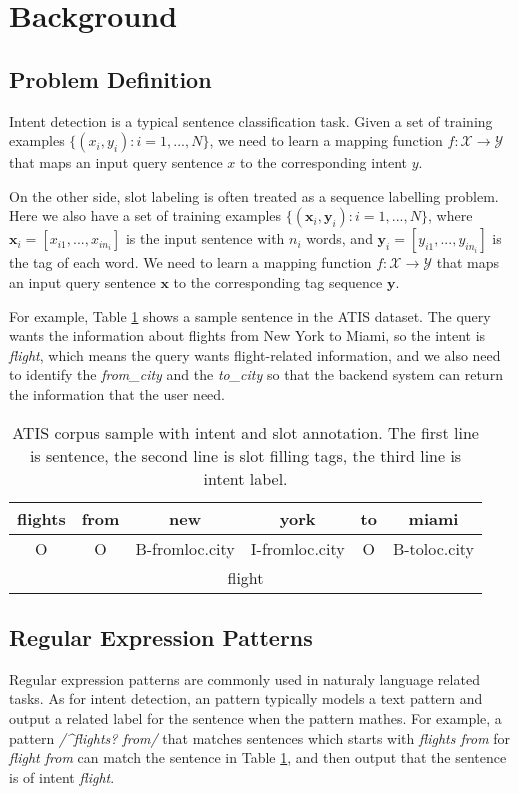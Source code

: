 \section{Background}
\subsection{Problem Definition}
Intent detection is a typical sentence classification task. Given a set of training examples $\{(x_i, y_i): i=1,...,N\}$, we need to learn a mapping function $f: \mathcal{X} \rightarrow \mathcal{Y}$ that maps an input query sentence $x$ to the corresponding intent $y$.

On the other side, slot labeling is often treated as a sequence labelling problem. Here we also have a set of training examples $\{(\textbf{x}_i, \textbf{y}_i): i=1,...,N\}$, where $\textbf{x}_i=[x_{i1}, ..., x_{in_i}]$ is the input sentence with $n_i$ words, and $\textbf{y}_i=[y_{i1}, ..., y_{in_i}]$ is the tag of each word. We need to learn a mapping function $f: \mathcal{X} \rightarrow \mathcal{Y}$ that maps an input query sentence $\textbf{x}$ to the corresponding tag sequence $\textbf{y}$.

For example, Table \ref{atis_sample} shows a sample sentence in the ATIS dataset. The query wants the information about flights from New York to Miami, so the intent is \emph{flight}, which means the query wants flight-related information, and we also need to identify the \emph{from\_city} and the \emph{to\_city} so that the backend system can return the information that the user need.

\begin{table}
\setlength{\tabcolsep}{0.23em}
\centering
\small{
\begin{tabular}{|c|c|c|c|c|c|}

\hline
flights &from &new &york &to &miami  \\
\hline
O &O &B-fromloc.city &I-fromloc.city &O &B-toloc.city  \\
\hline
\multicolumn{6}{|c|}{flight} \\
\hline
\end{tabular}
}
\caption{ATIS corpus sample with intent and slot annotation. The first line is sentence, the second line is slot filling tags, the third line is intent label.}
\label{atis_sample}
\end{table}

\subsection{Regular Expression Patterns}
Regular expression patterns are commonly used in naturaly language related tasks. As for intent detection, an \RE pattern typically models a text pattern and output a related label for the sentence when the pattern mathes. For example, a pattern 
\textsl{/\textasciicircum flights? from/} that matches sentences which starts with \emph{flights from} for \emph{flight from} can match the sentence in Table \ref{atis_sample}, and then output that the sentence is of intent \emph{flight}.

